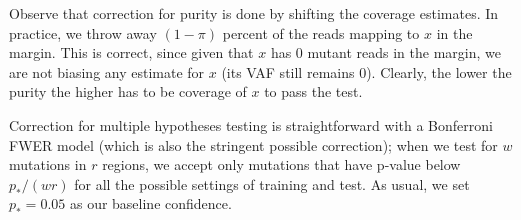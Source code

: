 \documentclass[10pt]{article}
\begin{document}
Observe that correction for purity is done by shifting the coverage estimates. In practice, we throw away $(1-\pi)$ percent of the reads mapping to $x$ in the margin. This is correct, since given that $x$ has $0$ mutant reads in the margin, we are not biasing any estimate for $x$ (its VAF still remains $0$). Clearly, the lower the purity the higher has to be coverage of $x$ to pass the test.

Correction for multiple hypotheses testing is straightforward with a Bonferroni FWER model (which is also the stringent possible correction); when we  test for $w$ mutations in $r$ regions, we accept only mutations that have p-value below $p_\ast/(wr)$ for all the possible  settings of training and test. As usual, we set   $p_\ast = 0.05$ as our baseline confidence. 

%
%
%
%
%
%
%
%
\end{document}

